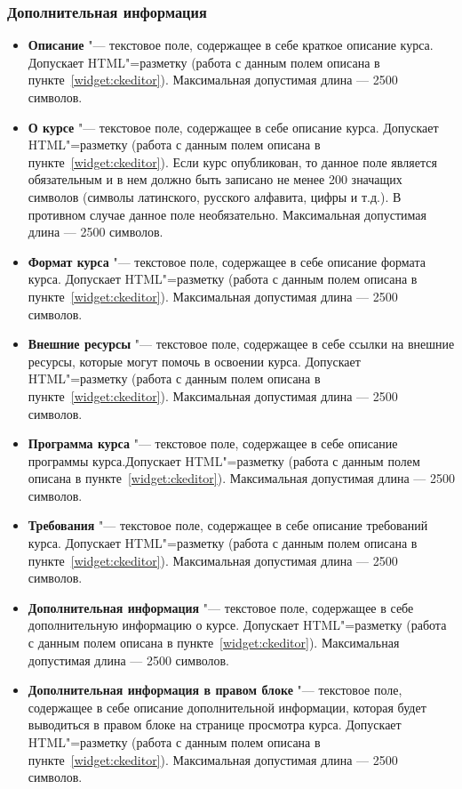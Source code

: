 \subsubsection{Дополнительная информация}
	\begin{itemize}
		\item \textbf{Описание} "--- текстовое поле, содержащее в себе краткое описание курса. Допускает HTML"=разметку (работа с данным полем описана в пункте~\ref{widget:ckeditor}).
		Максимальная допустимая длина --- 2500 символов.
		\item \textbf{О курсе} "--- текстовое поле, содержащее в себе описание курса.  Допускает HTML"=разметку (работа с данным полем описана в пункте~\ref{widget:ckeditor}). Если курс опубликован, то данное поле является обязательным и в нем должно быть записано не менее 200 значащих символов (символы латинского, русского алфавита, цифры и т.д.). В противном случае данное поле необязательно.
		Максимальная допустимая длина --- 2500 символов.
		\item \textbf{Формат курса} "--- текстовое поле, содержащее в себе описание формата курса. Допускает HTML"=разметку (работа с данным полем описана в пункте~\ref{widget:ckeditor}).
		Максимальная допустимая длина --- 2500 символов.
		\item \textbf{Внешние ресурсы} "--- текстовое поле, содержащее в себе ссылки на внешние ресурсы, которые могут помочь в освоении курса. Допускает HTML"=разметку (работа с данным полем описана в пункте~\ref{widget:ckeditor}).
		Максимальная допустимая длина --- 2500 символов.
		\item \textbf{Программа курса} "--- текстовое поле, содержащее в себе описание программы курса.Допускает HTML"=разметку (работа с данным полем описана в пункте~\ref{widget:ckeditor}).
		Максимальная допустимая длина --- 2500 символов.
		\item \textbf{Требования} "--- текстовое поле, содержащее в себе описание требований курса. Допускает HTML"=разметку (работа с данным полем описана в пункте~\ref{widget:ckeditor}).
		Максимальная допустимая длина --- 2500 символов.
		\item \textbf{Дополнительная информация} "--- текстовое поле, содержащее в себе дополнительную информацию о курсе. Допускает HTML"=разметку (работа с данным полем описана в пункте~\ref{widget:ckeditor}).
		Максимальная допустимая длина --- 2500 символов.
		\item \textbf{Дополнительная информация в правом блоке} "--- текстовое поле, содержащее в себе описание дополнительной информации, которая будет выводиться в правом блоке на странице просмотра курса. Допускает HTML"=разметку (работа с данным полем описана в пункте~\ref{widget:ckeditor}).
		Максимальная допустимая длина --- 2500 символов.
	\end{itemize}
